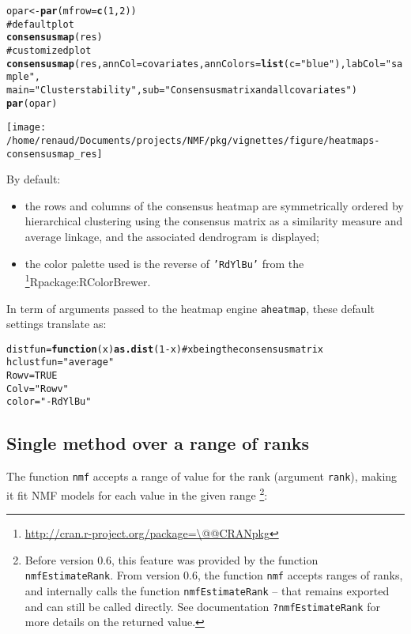 \documentclass[a4paper]{article}\usepackage{graphicx, color}
\makeatletter
\def\maxwidth{ %
  \ifdim\Gin@nat@width>\linewidth
    \linewidth
  \else
    \Gin@nat@width
  \fi
}
\newcommand{\hlfunctioncall}[1]{\textcolor[rgb]{0.501960784313725,0,0.329411764705882}{\textbf{#1}}}%
\newcommand{\hlstring}[1]{\textcolor[rgb]{0.6,0.6,1}{#1}}%
\newcommand{\hlcomment}[1]{\textcolor[rgb]{0.180392156862745,0.6,0.341176470588235}{#1}}%
\newenvironment{kframe}{%
 \def\at@end@of@kframe{}%
 \ifinner\ifhmode%
  \def\at@end@of@kframe{\end{minipage}}%
  \begin{minipage}{\columnwidth}%
 \fi\fi%
 \def\FrameCommand##1{\hskip\@totalleftmargin \hskip-\fboxsep
 \colorbox{shadecolor}{##1}\hskip-\fboxsep
     \hskip-\linewidth \hskip-\@totalleftmargin \hskip\columnwidth}%
 \MakeFramed {\advance\hsize-\width
   \@totalleftmargin\z@ \linewidth\hsize
   \@setminipage}}%
 {\par\unskip\endMakeFramed%
 \at@end@of@kframe}
\newenvironment{knitrout}{}{} %
\let\code=\texttt
\newcommand{\pkgname}[1]{\textit{#1}\xspace}
\newcommand{\CRANurl}[1]{\url{http://cran.r-project.org/package=#1}}
\def\CRANpkg{\@ifstar\@CRANpkg\@@CRANpkg}
\def\@CRANpkg#1{\href{http://cran.r-project.org/package=#1}{\pkgname{#1}}\footnote{\CRANurl{#1}}}
\def\@@CRANpkg#1{\href{http://cran.r-project.org/package=#1}{\pkgname{#1}} package\footnote{\CRANurl{#1}}}
\def\citeCRANpkg{\@ifstar\@citeCRANpkg\@@citeCRANpkg}
\def\@citeCRANpkg#1{\CRANpkg{#1}\cite*{Rpackage:#1}}
\def\@@citeCRANpkg#1{\CRANpkg{#1}~\cite{Rpackage:#1}}
\renewcommand{\cite}[1]{\parencite{#1}}
\makeatother
\begin{document}
\begin{knitrout}
\color{fgcolor}\begin{kframe}
\begin{alltt}
opar <- \hlfunctioncall{par}(mfrow = \hlfunctioncall{c}(1, 2))
\hlcomment{# default plot}
\hlfunctioncall{consensusmap}(res)
\hlcomment{# customized plot}
\hlfunctioncall{consensusmap}(res, annCol = covariates, annColors = \hlfunctioncall{list}(c = \hlstring{"blue"}), labCol = \hlstring{"sample "}, 
    main = \hlstring{"Cluster stability"}, sub = \hlstring{"Consensus matrix and all covariates"})
\hlfunctioncall{par}(opar)
\end{alltt}
\end{kframe}\texttt{[image: /home/renaud/Documents/projects/NMF/pkg/vignettes/figure/heatmaps-consensusmap\_res]} 
\end{knitrout}


By default:
\begin{itemize}
\item the rows and columns of the consensus heatmap are symmetrically 
ordered by hierarchical clustering using the consensus matrix as a similarity 
measure and average linkage, and the associated dendrogram is displayed;
\item the color palette used is the reverse of \code{'RdYlBu'} from the \citeCRANpkg{RColorBrewer}.
\end{itemize}

In term of arguments passed to the heatmap engine \code{aheatmap}, these default 
settings translate as:

\begin{knitrout}
\color{fgcolor}\begin{kframe}
\begin{alltt}
distfun = \hlfunctioncall{function}(x) \hlfunctioncall{as.dist}(1 - x)  \hlcomment{# x being the consensus matrix}
hclustfun = \hlstring{"average"}
Rowv = TRUE
Colv = \hlstring{"Rowv"}
color = \hlstring{"-RdYlBu"}
\end{alltt}
\end{kframe}
\end{knitrout}


\subsection{Single method over a range of ranks}

The function \code{nmf} accepts a range of value for the rank (argument \code{rank}), 
making it fit NMF models for each value in the given range
\footnote{Before version 0.6, this feature was provided by the function \code{nmfEstimateRank}.
From version 0.6, the function \code{nmf} accepts ranges of ranks, and internally 
calls the function \code{nmfEstimateRank} -- that remains exported and can still 
be called directly. 
See documentation \code{?nmfEstimateRank} for more details on the returned value.}:
\end{document}
